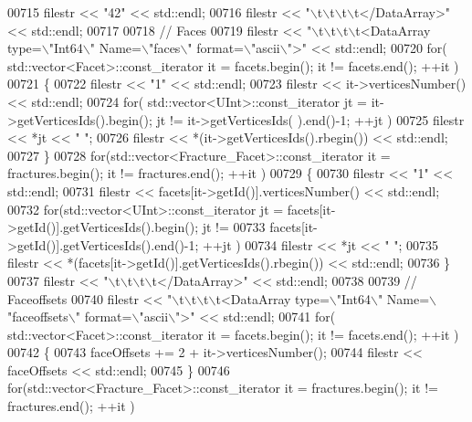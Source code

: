 \begin{DoxyCode}
00715         filestr << \textcolor{stringliteral}{"42"} << std::endl;
00716     filestr << \textcolor{stringliteral}{"\(\backslash\)t\(\backslash\)t\(\backslash\)t\(\backslash\)t</DataArray>"} << std::endl;
00717 
00718     \textcolor{comment}{//  Faces}
00719     filestr << \textcolor{stringliteral}{"\(\backslash\)t\(\backslash\)t\(\backslash\)t\(\backslash\)t<DataArray type=\(\backslash\)"Int64\(\backslash\)" Name=\(\backslash\)"faces\(\backslash\)" format=\(\backslash\)"ascii\(\backslash\)">"} << std::endl;
00720     \textcolor{keywordflow}{for}( std::vector<Facet>::const\_iterator it = facets.begin(); it != facets.end(); ++it )
00721     \{
00722         filestr << \textcolor{stringliteral}{"1"} << std::endl;
00723         filestr << it->verticesNumber() << std::endl;
00724         \textcolor{keywordflow}{for}( std::vector<UInt>::const\_iterator jt = it->getVerticesIds().begin(); jt != it->getVerticesIds(
      ).end()-1; ++jt )
00725             filestr << *jt << \textcolor{stringliteral}{" "};
00726         filestr << *(it->getVerticesIds().rbegin()) << std::endl;
00727     \}
00728     \textcolor{keywordflow}{for}(std::vector<Fracture\_Facet>::const\_iterator it = fractures.begin(); it != fractures.end(); ++it )
00729     \{
00730         filestr << \textcolor{stringliteral}{"1"} << std::endl;
00731         filestr << facets[it->getId()].verticesNumber() << std::endl;
00732         \textcolor{keywordflow}{for}(std::vector<UInt>::const\_iterator jt = facets[it->getId()].getVerticesIds().begin(); jt !=
00733             facets[it->getId()].getVerticesIds().end()-1; ++jt )
00734             filestr << *jt << \textcolor{stringliteral}{" "};
00735         filestr << *(facets[it->getId()].getVerticesIds().rbegin()) << std::endl;
00736     \}
00737     filestr << \textcolor{stringliteral}{"\(\backslash\)t\(\backslash\)t\(\backslash\)t\(\backslash\)t</DataArray>"} << std::endl;
00738 
00739     \textcolor{comment}{//  Faceoffsets}
00740     filestr << \textcolor{stringliteral}{"\(\backslash\)t\(\backslash\)t\(\backslash\)t\(\backslash\)t<DataArray type=\(\backslash\)"Int64\(\backslash\)" Name=\(\backslash\)"faceoffsets\(\backslash\)" format=\(\backslash\)"ascii\(\backslash\)">"} << std::endl;
00741     \textcolor{keywordflow}{for}( std::vector<Facet>::const\_iterator it = facets.begin(); it != facets.end(); ++it )
00742     \{
00743         faceOffsets += 2 + it->verticesNumber();
00744         filestr << faceOffsets << std::endl;
00745     \}
00746     \textcolor{keywordflow}{for}(std::vector<Fracture\_Facet>::const\_iterator it = fractures.begin(); it != fractures.end(); ++it )

\end{DoxyCode}
